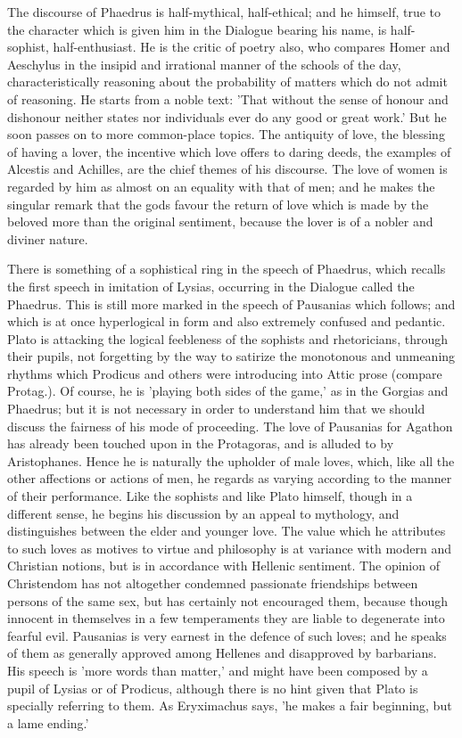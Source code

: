 \documentclass[11pt,letter]{article}
\begin{document}
\par  The discourse of Phaedrus is half-mythical, half-ethical; and he himself, true to the character which is given him in the Dialogue bearing his name, is half-sophist, half-enthusiast. He is the critic of poetry also, who compares Homer and Aeschylus in the insipid and irrational manner of the schools of the day, characteristically reasoning about the probability of matters which do not admit of reasoning. He starts from a noble text: 'That without the sense of honour and dishonour neither states nor individuals ever do any good or great work.' But he soon passes on to more common-place topics. The antiquity of love, the blessing of having a lover, the incentive which love offers to daring deeds, the examples of Alcestis and Achilles, are the chief themes of his discourse. The love of women is regarded by him as almost on an equality with that of men; and he makes the singular remark that the gods favour the return of love which is made by the beloved more than the original sentiment, because the lover is of a nobler and diviner nature.

\par  There is something of a sophistical ring in the speech of Phaedrus, which recalls the first speech in imitation of Lysias, occurring in the Dialogue called the Phaedrus. This is still more marked in the speech of Pausanias which follows; and which is at once hyperlogical in form and also extremely confused and pedantic. Plato is attacking the logical feebleness of the sophists and rhetoricians, through their pupils, not forgetting by the way to satirize the monotonous and unmeaning rhythms which Prodicus and others were introducing into Attic prose (compare Protag.). Of course, he is 'playing both sides of the game,' as in the Gorgias and Phaedrus; but it is not necessary in order to understand him that we should discuss the fairness of his mode of proceeding. The love of Pausanias for Agathon has already been touched upon in the Protagoras, and is alluded to by Aristophanes. Hence he is naturally the upholder of male loves, which, like all the other affections or actions of men, he regards as varying according to the manner of their performance. Like the sophists and like Plato himself, though in a different sense, he begins his discussion by an appeal to mythology, and distinguishes between the elder and younger love. The value which he attributes to such loves as motives to virtue and philosophy is at variance with modern and Christian notions, but is in accordance with Hellenic sentiment. The opinion of Christendom has not altogether condemned passionate friendships between persons of the same sex, but has certainly not encouraged them, because though innocent in themselves in a few temperaments they are liable to degenerate into fearful evil. Pausanias is very earnest in the defence of such loves; and he speaks of them as generally approved among Hellenes and disapproved by barbarians. His speech is 'more words than matter,' and might have been composed by a pupil of Lysias or of Prodicus, although there is no hint given that Plato is specially referring to them. As Eryximachus says, 'he makes a fair beginning, but a lame ending.'
\end{document}
